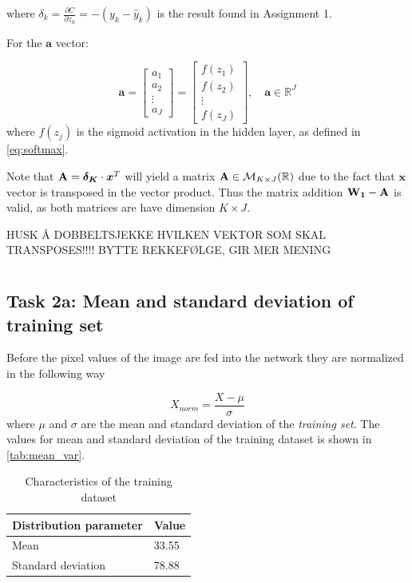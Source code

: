 \documentclass{article}
\begin{document}
where $\delta_k = \frac{\partial C}{\partial z_k} = -(y_k - \hat{y}_k)$ is the result found in Assignment 1.

For the $\boldsymbol{a}$ vector:

\begin{equation}
    \boldsymbol{a} = \begin{bmatrix}
        a_1 \\
        a_2 \\
        \vdots \\
        a_J
    \end{bmatrix}
    =
    \begin{bmatrix}
        f(z_1) \\
        f(z_2) \\
        \vdots \\
        f(z_J)
    \end{bmatrix},
    \quad \boldsymbol{a} \in \mathbb{R}^J
\end{equation}
where $f(z_j)$ is the sigmoid activation in the hidden layer, as defined in \eqref{eq:softmax}.


    Note that $\text{\textbf{A}} = \boldsymbol{\delta_K} \cdot \boldsymbol{x}^T$ will yield a matrix $\text{\textbf{A}} \in \mathcal{M}_{K \times J}(\mathbb{R})$ due to the fact that $\boldsymbol{x}$ vector is transposed in the vector product. Thus the matrix addition $\text{\textbf{W}}_\textbf{1} - \text{\textbf{A}}$ is valid, as both matrices are have dimension $K \times J$.  

HUSK Å DOBBELTSJEKKE HVILKEN VEKTOR SOM SKAL TRANSPOSES!!!!
BYTTE REKKEFØLGE, GIR MER MENING
\section{}
\subsection{Task 2a: Mean and standard deviation of training set}

Before the pixel values of the image are fed into the network they are normalized in the following way

\begin{equation}
    X_{norm} = \frac{X - \mu}{\sigma}
\end{equation}
where $\mu$ and $\sigma$ are the mean and standard deviation of the \textit{training set}. The values for mean and standard deviation of the training dataset is shown in \autoref{tab:mean_var}. 
\begin{table}[H]
\centering
\caption{Characteristics of the training dataset}
\label{tab:mean_var}
\begin{tabular}{|l|l|}
\hline
\textbf{Distribution parameter} & \textbf{Value} \\ \hline
Mean                            & 33.55          \\ \hline
Standard deviation              & 78.88          \\ \hline
\end{tabular}
\end{table}
\end{document}
